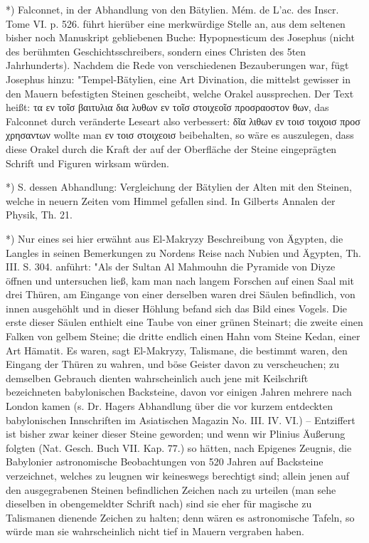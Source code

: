 \documentclass[a4paper, 11pt, oneside, polutonikogreek, german]{article}
\begin{document}
*) Falconnet, in der Abhandlung von den Bätylien. Mém. de L'ac. des Inscr. Tome VI. p. 526. führt hierüber eine merkwürdige Stelle an, aus dem seltenen bisher noch Manuskript gebliebenen Buche: Hypopnesticum des Josephus (nicht des berühmten Geschichtsschreibers, sondern eines Christen des 5ten Jahrhunderts). Nachdem die Rede von verschiedenen Bezauberungen war, fügt Josephus hinzu: "Tempel-Bätylien, eine Art Divination, die mittelst gewisser in den Mauern befestigten Steinen gescheibt, welche Orakel aussprechen. Der Text heißt: τα εν τοῖσ βαιτυλια δια λυθων εν τοῖσ στοιχεοῖσ προσραοστον θων, das Falconnet durch veränderte Leseart also verbessert: δῖα λιθων εν τοισ τοιχοισ προσ χρησαντων wollte man εν τοισ στοιχεοισ beibehalten, so wäre es auszulegen, dass diese Orakel durch die Kraft der auf der Oberfläche der Steine eingeprägten Schrift und Figuren wirksam würden.

*) S. dessen Abhandlung: Vergleichung der Bätylien der Alten mit den Steinen, welche in neuern Zeiten vom Himmel gefallen sind. In Gilberts Annalen der Physik, Th. 21.

*) Nur eines sei hier erwähnt aus El-Makryzy Beschreibung von Ägypten, die Langles in seinen Bemerkungen zu Nordens Reise nach Nubien und Ägypten, Th. III. S. 304. anführt: "Als der Sultan Al Mahmouhn die Pyramide von Diyze öffnen und untersuchen ließ, kam man nach langem Forschen auf einen Saal mit drei Thüren, am Eingange von einer derselben waren drei Säulen befindlich, von innen ausgehöhlt und in dieser Höhlung befand sich das Bild eines Vogels. Die erste dieser Säulen enthielt eine Taube von einer grünen Steinart; die zweite einen Falken von gelbem Steine; die dritte endlich einen Hahn vom Steine Kedan, einer Art Hämatit. Es waren, sagt El-Makryzy, Talismane, die bestimmt waren, den Eingang der Thüren zu wahren, und böse Geister davon zu verscheuchen; zu demselben Gebrauch dienten wahrscheinlich auch jene mit Keilschrift bezeichneten babylonischen Backsteine, davon vor einigen Jahren mehrere nach London kamen (s. Dr. Hagers Abhandlung über die vor kurzem entdeckten babylonischen Innschriften im Asiatischen Magazin No. III. IV. VI.) -- Entziffert ist bisher zwar keiner dieser Steine geworden; und wenn wir Plinius Äußerung folgten (Nat. Gesch. Buch VII. Kap. 77.) so hätten, nach Epigenes Zeugnis, die Babylonier astronomische Beobachtungen von 520 Jahren auf Backsteine verzeichnet, welches zu leugnen wir keineswegs berechtigt sind; allein jenen auf den ausgegrabenen Steinen befindlichen Zeichen nach zu urteilen (man sehe dieselben in obengemeldter Schrift nach) sind sie eher für magische zu Talismanen dienende Zeichen zu halten; denn wären es astronomische Tafeln, so würde man sie wahrscheinlich nicht tief in Mauern vergraben haben.
\end{document}
